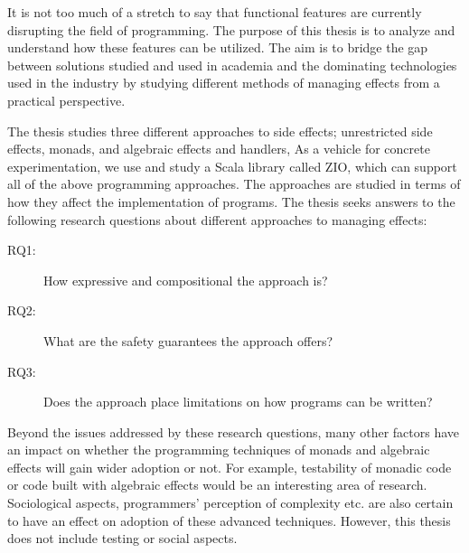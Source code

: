 It is not too much of a stretch to say that functional features are currently disrupting the field of programming. The purpose of this thesis is to analyze and understand how these features can be utilized. The aim is to bridge the gap between solutions studied and used in academia and the dominating technologies used in the industry by studying different methods of managing effects from a practical perspective.

The thesis studies three different approaches to side effects; unrestricted side effects, monads, and algebraic effects and handlers,  As a vehicle for concrete experimentation, we use and study a Scala library called ZIO, which can support all of the above programming approaches. The approaches are studied in terms of how they affect the implementation of programs. The thesis seeks answers to the following research questions about different approaches to managing effects:
\begin{description}
    \item[RQ1:] How expressive and compositional the approach is?
    \item[RQ2:] What are the safety guarantees the approach offers?
    \item[RQ3:] Does the approach place limitations on how programs can be written?
\end{description}


Beyond the issues addressed by these research questions, many other factors have an impact on whether the programming techniques of monads and algebraic effects will gain wider adoption or not. For example, testability of monadic code or code built with algebraic effects would be an interesting area of research. 
Sociological aspects, programmers' perception of complexity etc. are also certain to have an effect on adoption of these advanced techniques. However, this thesis does not include testing or social aspects.

